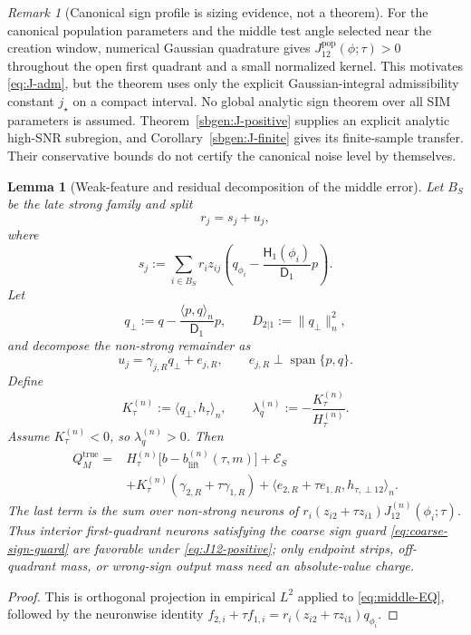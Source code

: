 \documentclass{article} %
\theoremstyle{plain}
\newtheorem{lemma}[theorem]{Lemma}
\theoremstyle{definition}
\theoremstyle{remark}
\newtheorem{remark}[theorem]{Remark}
\begin{document}
\begin{remark}[Canonical sign profile is sizing evidence, not a theorem]
For the canonical population parameters and the middle test angle selected
near the creation window, numerical Gaussian quadrature gives
$J_{12}^{\mathrm{pop}}(\phi;\tau)>0$ throughout the open first quadrant and a
small normalized kernel.  This motivates \eqref{eq:J-adm}, but the theorem
uses only the explicit Gaussian-integral admissibility constant $j_\star$ on
a compact interval.  No global analytic sign theorem over all SIM parameters
is assumed. Theorem~\ref{sbgen:J-positive} supplies an explicit analytic
high-SNR subregion, and Corollary~\ref{sbgen:J-finite} gives its
finite-sample transfer. Their conservative bounds do not certify the
canonical noise level by themselves.
\end{remark}

\begin{lemma}[Weak-feature and residual decomposition of the middle error]
\label{lem:middle-signed-decomposition}
Let $B_S$ be the late strong family and split
\[
r_j=s_j+u_j,
\]
where
\[
s_j
:=
\sum_{i\in B_S}
r_i z_{ij}
\left(
q_{\phi_i}-\frac{\mathsf H_1(\phi_i)}{\mathsf D_1}p
\right).
\]
Let
\[
q_\perp
:=
q-\frac{\langle p,q\rangle_n}{\mathsf D_1}p,
\qquad
D_{2|1}:=\|q_\perp\|_n^2,
\]
and decompose the non-strong remainder as
\[
u_j=\gamma_{j,R}q_\perp+e_{j,R},
\qquad
e_{j,R}\perp\operatorname{span}\{p,q\}.
\]
Define
\[
K_\tau^{(n)}:=\langle q_\perp,h_\tau\rangle_n,
\qquad
\lambda_q^{(n)}:=-\frac{K_\tau^{(n)}}{H_\tau^{(n)}}.
\]
Assume $K_\tau^{(n)}<0$, so $\lambda_q^{(n)}>0$. Then
\[
\boxed{
\begin{aligned}
Q_M^{\mathrm{true}}
={}&
H_\tau^{(n)}
\bigl[b-b_{\mathrm{lift}}^{(n)}(\tau,m)\bigr]
+
\mathcal E_S
\\
&+
K_\tau^{(n)}(\gamma_{2,R}+\tau\gamma_{1,R})
+
\langle e_{2,R}+\tau e_{1,R},h_{\tau,\perp12}\rangle_n.
\end{aligned}
}
\tag{middle-signed-full}\label{eq:middle-signed-full}
\]
The last term is the sum over non-strong neurons of
$r_i(z_{i2}+\tau z_{i1})J_{12}^{(n)}(\phi_i;\tau)$.
Thus interior first-quadrant neurons satisfying the coarse sign guard
\eqref{eq:coarse-sign-guard} are favorable under
\eqref{eq:J12-positive}; only endpoint strips, off-quadrant mass, or
wrong-sign output mass need an absolute-value charge.
\end{lemma}

\begin{proof}
This is orthogonal projection in empirical $L^2$ applied to
\eqref{eq:middle-EQ}, followed by the neuronwise identity
$f_{2,i}+\tau f_{1,i}=r_i(z_{i2}+\tau z_{i1})q_{\phi_i}$.
\end{proof}
\end{document}
